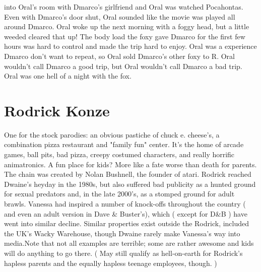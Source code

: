 \documentclass[12pt]{book}
\begin{document}
into Oral's room with Dmarco's girlfriend and Oral was watched Pocahontas. Even with Dmarco's door shut, Oral sounded like the movie was played all around Dmarco. Oral woke up the next morning with a foggy head, but a little weeded cleared that up! The body load the foxy gave Dmarco for the first few hours was hard to control and made the trip hard to enjoy. Oral was a experience Dmarco don't want to repeat, so Oral sold Dmarco's other foxy to R. Oral wouldn't call Dmarco a good trip, but Oral wouldn't call Dmarco a bad trip. Oral was one hell of a night with the fox.



\chapter{Rodrick Konze}

One for the stock parodies: an obvious pastiche of chuck e. cheese's, a combination pizza restaurant and "family fun" center. It's the home of arcade games, ball pits, bad pizza, creepy costumed characters, and really horrific animatronics. A fun place for kids? More like a fate worse than death for parents. The chain was created by Nolan Bushnell, the founder of atari. Rodrick reached Dwaine's heyday in the 1980s, but also suffered bad publicity as a hunted ground for sexual predators and, in the late 2000's, as a stomped ground for adult brawls. Vanessa had inspired a number of knock-offs throughout the country ( and even an adult version in Dave \& Buster's), which ( except for D\&B ) have went into similar decline. Similar properties exist outside the Rodrick, included the UK's Wacky Warehouse, though Dwaine rarely make Vanessa's way into media.Note that not all examples are terrible; some are rather awesome and kids will do anything to go there. ( May still qualify as hell-on-earth for Rodrick's hapless parents and the equally hapless teenage employees, though. )
\end{document}
